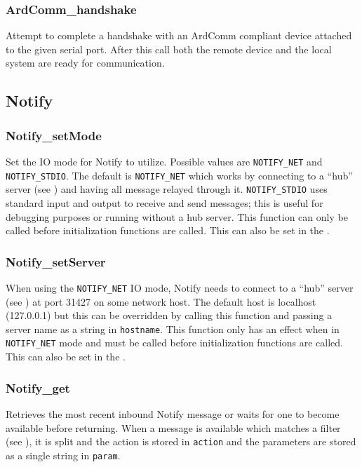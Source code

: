 \subsubsection{ArdComm\_handshake} \label{apiardcommhandshake}
 Attempt to complete a handshake
with an ArdComm compliant device attached to the given serial port. After this
call both the remote device and the local system are ready for communication.


\subsection{Notify} \label{apinotify}
\subsubsection{Notify\_setMode} \label{apinotifysetmode}
 Set the IO mode for Notify to
utilize. Possible values are \texttt{NOTIFY\_NET} and
\texttt{NOTIFY\_STDIO}. The default is \texttt{NOTIFY\_NET} which works by
connecting to a ``hub'' server (see ) and
having all message relayed through it. \texttt{NOTIFY\_STDIO} uses standard
input and output to receive and send messages; this is useful for debugging
purposes or running without a hub server. This function can only be called
before initialization functions are called. This can also be set in the
.

\subsubsection{Notify\_setServer} \label{apinotifysetserver}
 When using the \texttt{NOTIFY\_NET}
IO mode, Notify needs to connect to a ``hub'' server (see
) at port 31427 on some network host. The
default host is localhost (127.0.0.1) but this can be overridden by calling this
function and passing a server name as a string in \texttt{hostname}. This
function only has an effect when in \texttt{NOTIFY\_NET} mode and must be called
before initialization functions are called. This can also be set in the
.

\subsubsection{Notify\_get} \label{apinotifyget}
 Retrieves the most recent
inbound Notify message or waits for one to become available before
returning. When a message is available which matches a filter (see
), it is split and the action is
stored in \texttt{action} and the parameters are stored as a single string in
\texttt{param}.

